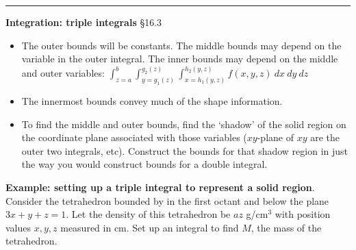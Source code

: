 \documentclass[12pt,letterpaper,noanswers]{exam}
\begin{document}
\vspace{0.2cm}
\hrule
\vspace{0.2cm}

\eject

\noindent\textbf{Integration: triple integrals} \S 16.3
\begin{tcolorbox}
\begin{itemize}
\item The outer bounds will be constants.  The middle bounds may depend on the variable in the outer integral.  The inner bounds may depend on the middle and outer variables: $\displaystyle\int_{z=a}^{b}\int_{y=g_1(z)}^{g_2(z)}\int_{x=h_1(y,z)}^{h_2(y,z)}f(x,y,z)\ dx\ dy\ dz$
\item The innermost bounds convey much of the shape information.  \item To find the middle and outer bounds, find the `shadow' of the solid region on the coordinate plane associated with those variables ($xy$-plane of $xy$ are the outer two integrals, etc).  Construct the bounds for that shadow region in just the way you would construct bounds for a double integral. 
\end{itemize}
\end{tcolorbox}

\noindent\textbf{Example: setting up a triple integral to represent a solid region}. Consider the tetrahedron bounded by in the first octant and below the plane $3x + y + z = 1$. Let the density of this tetrahedron be $az$ g/cm$^3$ with position values $x,y,z$ measured in cm.  Set up an integral to find $M$, the mass of the tetrahedron.

\end{document}
